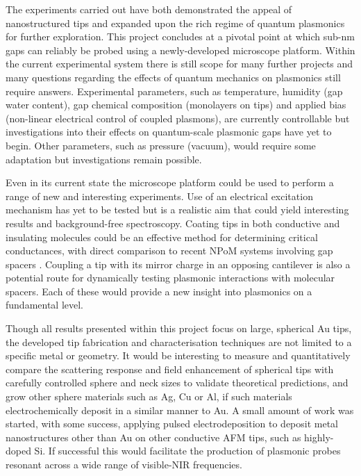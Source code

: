 \documentclass[12pt, a4paper, oneside]{book}
\begin{document}
The experiments carried out have both demonstrated the appeal of nanostructured tips and expanded upon the rich regime of quantum plasmonics for further exploration. This project concludes at a pivotal point at which sub-nm gaps can reliably be probed using a newly-developed microscope platform. Within the current experimental system there is still scope for many further projects and many questions regarding the effects of quantum mechanics on plasmonics still require answers. Experimental parameters, such as temperature, humidity (gap water content), gap chemical composition (monolayers on tips) and applied bias (non-linear electrical control of coupled plasmons), are currently controllable but investigations into their effects on quantum-scale plasmonic gaps have yet to begin. Other parameters, such as pressure (vacuum), would require some adaptation but investigations remain possible.

Even in its current state the microscope platform could be used to perform a range of new and interesting experiments. Use of an electrical excitation mechanism has yet to be tested but is a realistic aim that could yield interesting results and background-free spectroscopy. Coating tips in both conductive and insulating molecules could be an effective method for determining critical conductances, with direct comparison to recent NPoM systems involving gap spacers \cite{mertens2013, benz2014, cha2014, denijs2014}. Coupling a tip with its mirror charge in an opposing cantilever is also a potential route for dynamically testing plasmonic interactions with molecular spacers. Each of these would provide a new insight into plasmonics on a fundamental level.

Though all results presented within this project focus on large, spherical Au tips, the developed tip fabrication and characterisation techniques are not limited to a specific metal or geometry. It would be interesting to measure and quantitatively compare the scattering response and field enhancement of spherical tips with carefully controlled sphere and neck sizes to validate theoretical predictions, and grow other sphere materials such as Ag, Cu or Al, if such materials electrochemically deposit in a similar manner to Au. A small amount of work was started, with some success, applying pulsed electrodeposition to deposit metal nanostructures other than Au on other conductive AFM tips, such as highly-doped Si. If successful this would facilitate the production of plasmonic probes resonant across a wide range of visible-NIR frequencies.
\end{document}
